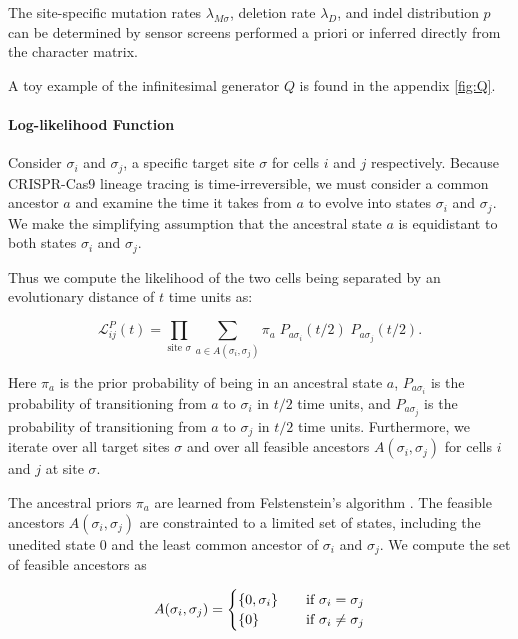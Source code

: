 \documentclass{article}
\begin{document}
The site-specific mutation rates $\lambda_{M \sigma}$, deletion rate $\lambda_D$, and indel distribution $p$ can be determined by sensor screens performed a priori or inferred directly from the character matrix.

A toy example of the infinitesimal generator $Q$ is found in the appendix \ref{fig:Q}.

\paragraph*{Log-likelihood Function} Consider $\sigma_i$ and $\sigma_j$, a specific target site $\sigma$ for cells $i$ and $j$ respectively. Because CRISPR-Cas9 lineage tracing is time-irreversible, we must consider a common ancestor $a$ and examine the time it takes from $a$ to evolve into states $\sigma_i$ and $\sigma_j$. We make the simplifying assumption that the ancestral state $a$ is equidistant to both states $\sigma_i$ and $\sigma_j$. 

Thus we compute the likelihood of the two cells being separated by an evolutionary distance of $t$ time units as:

\begin{equation}
  \mathcal{L}_{ij}^P (t) = \prod_{\textrm{site } \sigma} \sum_{a \in A(\sigma_i, \sigma_j)} \pi_a \; P_{a \sigma_i}(t/2) \; P_{a \sigma_j}(t/2).
\end{equation}

Here $\pi_a$ is the prior probability of being in an ancestral state $a$, $P_{a \sigma_i}$ is the probability of transitioning from $a$ to $\sigma_i$ in $t/2$ time units, and $P_{a \sigma_j}$ is the probability of transitioning from $a$ to $\sigma_j$ in $t/2$ time units. Furthermore, we iterate over all target sites $\sigma$ and over all feasible ancestors $A(\sigma_i, \sigma_j)$ for cells $i$ and $j$ at site $\sigma$.

The ancestral priors $\pi_a$ are learned from Felstenstein's algorithm \cite{felsenstein1973maximum}. The feasible ancestors $A(\sigma_i, \sigma_j)$ are constrainted to a limited set of states, including the unedited state $0$ and the least common ancestor of $\sigma_i$ and $\sigma_j$. We compute the set of feasible ancestors as

\begin{equation}
  A(\sigma_i, \sigma_j) = \begin{cases}
    \{0, \sigma_i \} & \textrm{\quad if } \sigma_i = \sigma_j \\
    \{0 \} & \textrm{\quad if } \sigma_i \neq \sigma_j \\
  \end{cases}
\end{equation}
\end{document}
